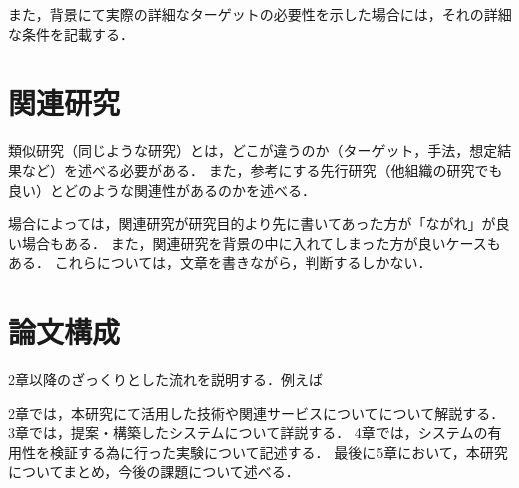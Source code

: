 また，背景にて実際の詳細なターゲットの必要性を示した場合には，それの詳細な条件を記載する．

\section{関連研究}
類似研究（同じような研究）とは，どこが違うのか（ターゲット，手法，想定結果など）を述べる必要がある．
また，参考にする先行研究（他組織の研究でも良い）とどのような関連性があるのかを述べる．

場合によっては，関連研究が研究目的より先に書いてあった方が「ながれ」が良い場合もある．
また，関連研究を背景の中に入れてしまった方が良いケースもある．
これらについては，文章を書きながら，判断するしかない．

\section{論文構成}
2章以降のざっくりとした流れを説明する．例えば

2章では，本研究にて活用した技術や関連サービスについてについて解説する．
3章では，提案・構築したシステムについて詳説する．
4章では，システムの有用性を検証する為に行った実験について記述する．
最後に5章において，本研究についてまとめ，今後の課題について述べる．


